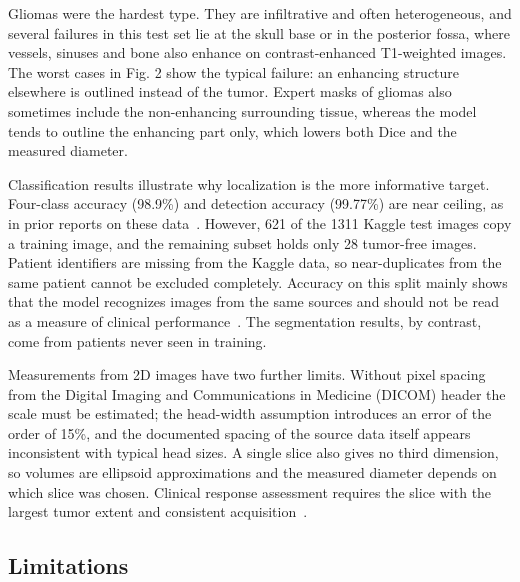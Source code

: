 \documentclass[pdflatex,sn-vancouver-num]{sn-jnl}
\begin{document}
Gliomas were the hardest type. They are infiltrative and often heterogeneous, and several failures in this test set lie at the skull base or in the posterior fossa, where vessels, sinuses and bone also enhance on contrast-enhanced T1-weighted images. The worst cases in Fig. 2 show the typical failure: an enhancing structure elsewhere is outlined instead of the tumor. Expert masks of gliomas also sometimes include the non-enhancing surrounding tissue, whereas the model tends to outline the enhancing part only, which lowers both Dice and the measured diameter.

Classification results illustrate why localization is the more informative target. Four-class accuracy (98.9\%) and detection accuracy (99.77\%) are near ceiling, as in prior reports on these data~\cite{swati2019,deepak2019}. However, 621 of the 1311 Kaggle test images copy a training image, and the remaining subset holds only 28 tumor-free images. Patient identifiers are missing from the Kaggle data, so near-duplicates from the same patient cannot be excluded completely. Accuracy on this split mainly shows that the model recognizes images from the same sources and should not be read as a measure of clinical performance~\cite{varoquaux2022,roberts2021}. The segmentation results, by contrast, come from patients never seen in training.

Measurements from 2D images have two further limits. Without pixel spacing from the Digital Imaging and Communications in Medicine (DICOM) header the scale must be estimated; the head-width assumption introduces an error of the order of 15\%, and the documented spacing of the source data itself appears inconsistent with typical head sizes. A single slice also gives no third dimension, so volumes are ellipsoid approximations and the measured diameter depends on which slice was chosen. Clinical response assessment requires the slice with the largest tumor extent and consistent acquisition~\cite{wen2010rano}.

\subsection{Limitations}
\end{document}
